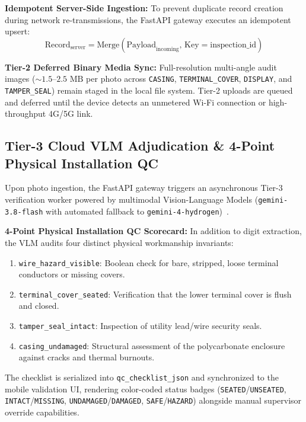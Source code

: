 \documentclass[conference]{IEEEtran}
\begin{document}
\textbf{Idempotent Server-Side Ingestion:} To prevent duplicate record creation during network re-transmissions, the FastAPI gateway executes an idempotent upsert:
\begin{equation}
\text{Record}_{\text{server}} = \text{Merge}\left(\text{Payload}_{\text{incoming}}, \, \text{Key} = \text{inspection\_id}\right)
\label{eq:upsert}
\end{equation}

\textbf{Tier-2 Deferred Binary Media Sync:} Full-resolution multi-angle audit images ($\sim 1.5\text{--}2.5\text{~MB}$ per photo across \texttt{CASING}, \texttt{TERMINAL\_COVER}, \texttt{DISPLAY}, and \texttt{TAMPER\_SEAL}) remain staged in the local file system. Tier-2 uploads are queued and deferred until the device detects an unmetered Wi-Fi connection or high-throughput 4G/5G link.

\subsection{Tier-3 Cloud VLM Adjudication \& 4-Point Physical Installation QC}
Upon photo ingestion, the FastAPI gateway triggers an asynchronous Tier-3 verification worker powered by multimodal Vision-Language Models (\texttt{gemini-3.8-flash} with automated fallback to \texttt{gemini-4-hydrogen})~\cite{gemini2023team}.

\textbf{4-Point Physical Installation QC Scorecard:} In addition to digit extraction, the VLM audits four distinct physical workmanship invariants:
\begin{enumerate}
    \item \texttt{wire\_hazard\_visible}: Boolean check for bare, stripped, loose terminal conductors or missing covers.
    \item \texttt{terminal\_cover\_seated}: Verification that the lower terminal cover is flush and closed.
    \item \texttt{tamper\_seal\_intact}: Inspection of utility lead/wire security seals.
    \item \texttt{casing\_undamaged}: Structural assessment of the polycarbonate enclosure against cracks and thermal burnouts.
\end{enumerate}
The checklist is serialized into \texttt{qc\_checklist\_json} and synchronized to the mobile validation UI, rendering color-coded status badges (\texttt{SEATED}/\texttt{UNSEATED}, \texttt{INTACT}/\texttt{MISSING}, \texttt{UNDAMAGED}/\texttt{DAMAGED}, \texttt{SAFE}/\texttt{HAZARD}) alongside manual supervisor override capabilities.
\end{document}
